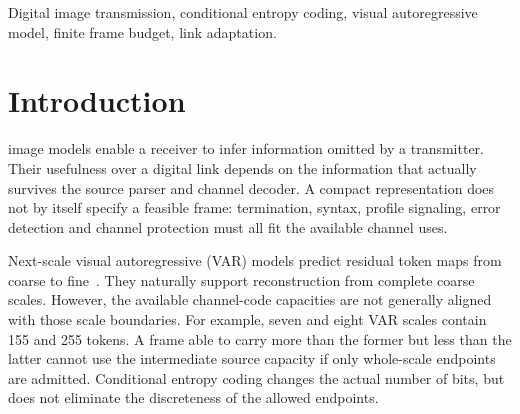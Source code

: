 \begin{abstract}
A frozen next-scale image model can complete a representation from a transmitted prefix, but whole-scale stopping points need not use a finite digital frame efficiently. NeST-Com admits raster-ordered endpoints inside a scale, conditionally entropy-codes the selected tokens, and falls back through a frozen chain until the actual terminated stream fits. A paid profile identifies the endpoint and channel layout; an isolated receiver entropy-decodes transmitted tokens before generating the unsent part. At 1024 complex channel uses, the corrected 19-dB comparison on 500 images improves PSNR by 0.319 dB over the same-prior entropy-coded whole-scale family, with a 95\% source-paired interval of [0.290, 0.349] dB. Low-SNR pixel fidelity and perceptual metrics still favor different baseline systems. A separate matched 100-source study adapts native ARPC to the same digital budget. At 2048 uses, finite calibration selects equally protected two-fragment policies for 4/10 dB. All 1200 test objects across the two methods are correctly received, and NeST-Com's paired PSNR gains are 3.779 and 3.877 dB; all seven metrics favor it at these two points. A distinct 19-dB test delivers both complete representations: ARPC then has lower DISTS, while DINO and prediction-agreement intervals cross zero. The results identify useful finite-budget operating points and their boundaries without attributing all system differences to endpoint granularity.
\end{abstract}
\begin{IEEEkeywords}
Digital image transmission, conditional entropy coding, visual autoregressive model, finite frame budget, link adaptation.
\end{IEEEkeywords}

\section{Introduction}
 image models enable a receiver to infer information omitted by a transmitter. Their usefulness over a digital link depends on the information that actually survives the source parser and channel decoder. A compact representation does not by itself specify a feasible frame: termination, syntax, profile signaling, error detection and channel protection must all fit the available channel uses.

Next-scale visual autoregressive (VAR) models predict residual token maps from coarse to fine~\cite{tian2024var}. They naturally support reconstruction from complete coarse scales. However, the available channel-code capacities are not generally aligned with those scale boundaries. For example, seven and eight VAR scales contain 155 and 255 tokens. A frame able to carry more than the former but less than the latter cannot use the intermediate source capacity if only whole-scale endpoints are admitted. Conditional entropy coding changes the actual number of bits, but does not eliminate the discreteness of the allowed endpoints.

